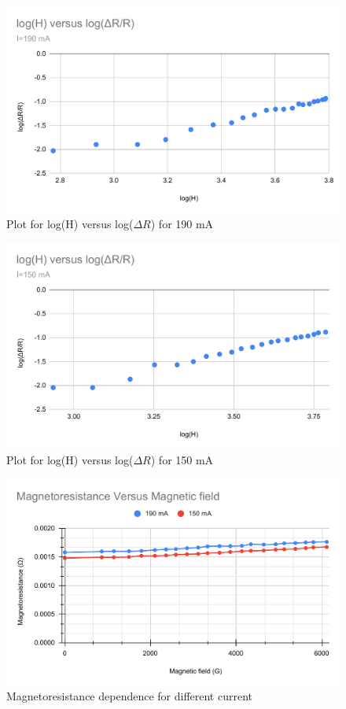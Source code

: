 \documentclass[a4paper, amsfonts, amssymb, amsmath, reprint, showkeys, nofootinbib, twoside]{revtex4-1}
\begin{document}
\begin{figure}[H]
	\centering
	\includegraphics[scale=0.4]{ln1} 
	\caption{Plot for log(H) versus log($\Delta R$) for 190 mA}
	\label{2}
\end{figure}

\begin{figure}[H]
	\centering
	\includegraphics[scale=0.4]{ln2} 
	\caption{Plot for log(H) versus log($\Delta R$) for 150 mA}
	\label{2}
\end{figure}

\begin{figure}[H]
	\centering
	\includegraphics[scale=0.4]{kk} 
	\caption{Magnetoresistance dependence for different current}
	\label{2}
\end{figure}
\end{document}
